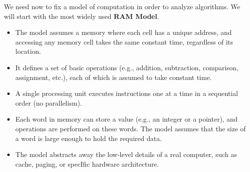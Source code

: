 We need now to fix a model of computation in order to analyze algorithms. We will start with the most widely used \textbf{RAM Model}.
\begin{itemize}
    \item The model assumes a memory where each cell has a unique address, and accessing any memory cell takes the same constant time, regardless of its location. 
    \item It defines a set of basic operations (e.g., addition, subtraction, comparison, assignment, etc.), each of which is assumed to take constant time.
    \item A single processing unit executes instructions one at a time in a sequential order (no parallelism).
    \item Each word in memory can store a value (e.g., an integer or a pointer), and operations are performed on these words. The model assumes that the size of a word is large enough to hold the required data.
    \item The model abstracts away the low-level details of a real computer, such as cache, paging, or specIfic hardware architecture.
\end{itemize}